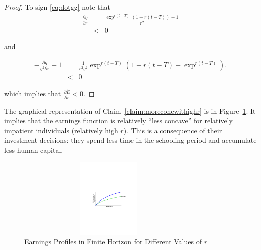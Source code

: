 \begin{proof}
\indent To sign \eqref{eq:dotgg} note that
\begin{eqnarray}
\frac{\partial g}{\partial r} &=& \frac{\exp^{r(t-T)} \left( 1 - r(t - T) \right) - 1 }{r^2} \nonumber \\
&<& 0 \label{eq:partialgr}
\end{eqnarray}

\noindent and

\begin{eqnarray}
- \frac{\partial g }{g^2 \partial r} - 1 &=& \frac{1}{r^2g^2} \exp^{r(t-T)} \left( 1 + r(t - T) - \exp^{r(t-T)} \right). \nonumber \\
&<& 0
\end{eqnarray}

\noindent which implies that $\frac{\partial \dot{E}}{\partial r} < 0$. 
\end{proof}

\indent The graphical representation of Claim~\ref{claim:moreconcwithighr} is in Figure~\ref{fig:earnprofr}. It implies that the earnings function is relatively ``less concave'' for relatively impatient individuals (relatively high $r$). This is a consequence of their investment decisions: they spend less time in the schooling period and accumulate less human capital.

\begin{center}
\begin{figure}[H]
\caption{Earnings Profiles in Finite Horizon for Different Values of $r$ } \label{fig:earnprofr}
\centering
\includegraphics[width=3.5in, height=1.5in]{Figures/fig-earnings-growth.pdf}
\floatfoot{\begin{small}
\end{small}}
\end{figure}
\end{center}

